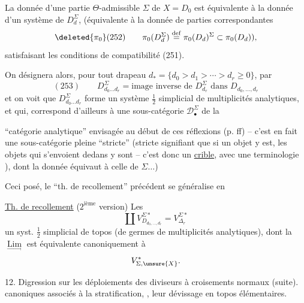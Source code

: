 La donnée d'une partie $\Theta$-admissible $\Sigma$ de $X=D_0$ est équivalente à la donnée d'un système de $D_d^\Sigma$, (équivalente à la donnée de parties correspondantes
\[
\deleted{\pi_0}(252)\qquad
\pi_0(D_d^\Sigma)\overset{\mathrm{def}}=\pi_0(D_d)^\Sigma\subset\pi_0(D_d)),
\]
satisfaisant les conditions de compatibilité (251).

On désignera alors, pour tout drapeau $d_*=\{d_0>d_1>\cdots>d_r\geq0\}$, par
\[
(253)\qquad D_{d_0\ldots d_r}^\Sigma=\text{image inverse de }D_{d_r}^\Sigma
\text{ dans }D_{d_0,\ldots,d_r}
\]
et on voit que  $D_{d_0\ldots d_r}^\Sigma$ forme un système $\frac12$ simplicial de  multiplicités analytiques, et qui,  correspond d'ailleurs à une sous-catégorie $\mathcal D_\bullet^\Sigma$ de la

``catégorie analytique'' envisagée au début de ces réflexions (p. ff) -- c'est en fait une sous-catégorie pleine ``stricte'' (stricte signifiant que si un objet y est, les objets qui s'envoient dedans y sont -- c'est donc un \uline{crible}, avec une terminologie ), dont la donnée équivaut à celle de \deleted{$\unsure{\Theta}$} $\Sigma\ldots$)

Ceci posé, le ``th. de recollement'' précédent se généralise en

\uline{Th. de recollement} ($2^{\text{ième}}$ version) Les
\[
\coprod V_{D_{d_0,\ldots,d_r}}^{\Sigma *}=V_{\Delta_r}^{\Sigma *}
\]
 un syst. $\frac12$ simplicial de topos (de germes de multiplicités analytiques), dont la $\underset{\longrightarrow}{\operatorname{Lim}}$ est équivalente canoniquement à
\[
V^*_{\Sigma,\unsure{X}}.
\]

12. Digression sur les déploiements des diviseurs à croisements normaux (suite).   canoniques associés à la stratification, , leur dévissage en topos élémentaires.

